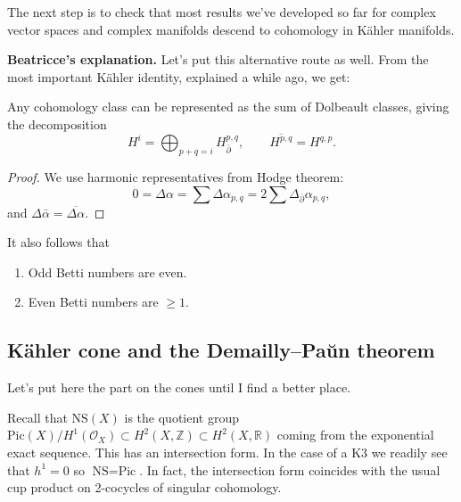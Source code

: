 \noindent
The next step is to check
that most results we've developed so far for
complex vector spaces and complex manifolds
descend to cohomology in Kähler manifolds.

\medskip\noindent
{\bf Beatricce's explanation.}
Let's put this alternative route as well.
From the most important Kähler identity,
explained a while ago, we get:

\begin{corollary}
\label{lemma-hodge-kahler-important}
Any cohomology class can be represented
as the sum of Dolbeault classes,
giving the decomposition
$$
H^i
=
\bigoplus_{p+q=i}H^{p,q}_{\bar\partial},
\qquad
\overline{H^{p,q}}=H^{q,p}.
$$
\end{corollary}

\begin{proof}
We use harmonic representatives
from Hodge theorem:
$$
0=\Delta \alpha =
\sum \Delta \alpha_{p,q}
=
2 \sum \Delta_{\bar\partial}\alpha_{p,q},
$$
and $\Delta \bar{\alpha}=\overline{\Delta
\alpha}$.
\end{proof}

\noindent
It also follows that
\begin{enumerate}
\item Odd Betti numbers are even.
\item Even Betti numbers are $\geq 1$.
\end{enumerate}



\subsection{Kähler cone and the
Demailly--Pa\u un
theorem}
\label{subsection-kahler-cone-demailly-paun}

\medskip\noindent
Let's put here the part on the cones until
I find a better place.

Recall that $\text{NS}(X)$ is the quotient
group
$\text{Pic}(X)/H^1(\mathcal{O}_X)\subset
H^2(X,\mathbb{Z})
\subset H^2(X,\mathbb{R})$
coming from the exponential exact sequence.
This has an intersection form.
In the case of a K3 we readily see that
$h^1=0$ so $\text{NS}=\text{Pic}$.
In fact, the intersection form coincides with
the usual cup product on 2-cocycles of
singular cohomology.


